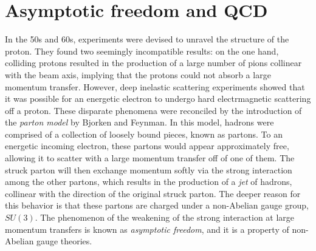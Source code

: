 \section{Asymptotic freedom and QCD}
In the 50s and 60s, experiments were devised to unravel the structure of the proton. They found two seemingly incompatible results: on the one hand, colliding protons resulted in the production of a large number of pions collinear with the beam axis, implying that the protons could not absorb a large momentum transfer. However, deep inelastic scattering experiments showed that it was possible for an energetic electron to undergo hard electrmagnetic scattering off a proton. These disparate phenomena were reconciled by the introduction of the \emph{parton model} by Bjorken and Feynman. In this model, hadrons were comprised of a collection of loosely bound pieces, known as partons. To an energetic incoming electron, these partons would appear approximately free, allowing it to scatter with a large momentum transfer off of one of them. The struck parton will then exchange momentum softly via the strong interaction among the other partons, which results in the production of a \emph{jet} of hadrons, collinear with the direction of the original struck parton. The deeper reason for this behavior is that these partons are charged under a non-Abelian gauge group, $SU(3)$. The phenomenon of the weakening of the strong interaction at large momentum transfers is known as \emph{asymptotic freedom}, and it is a property of non-Abelian gauge theories.

